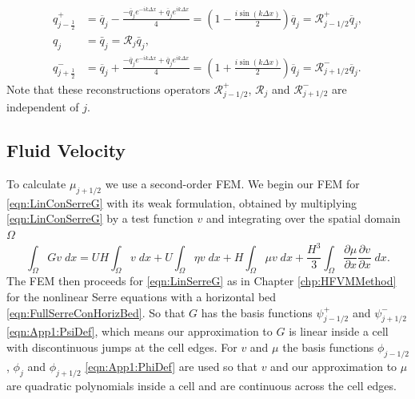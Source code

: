 \begin{subequations}
	\label{eqn:RpmfactorFDVM}
	\begin{align}
	q^+_{j-\frac{1}{2}} &= \overline{q}_j - \frac{- \overline{q}_{j} e^{-ik\Delta x} + \overline{q}_{j} e^{ik\Delta x}}{4} = \left(1  - \frac{i\sin\left(k\Delta x\right)}{2} \right)\overline{q}_{j} = \mathcal{R}^+_{j-1/2}\overline{q}_{j}, \\
	q_j &= \bar{q}_j = \mathcal{R}_{j} \bar{q}_j,\\
	q^-_{j+\frac{1}{2}} &=\overline{q}_j + \frac{- \overline{q}_{j} e^{-ik\Delta x} + \overline{q}_{j} e^{ik\Delta x}}{4} = \left(1  + \frac{i\sin\left(k\Delta x\right)}{2} \right)\overline{q}_{j} =\mathcal{R}^-_{j+1/2} \overline{q}_{j}.
	\end{align}
\end{subequations}  
Note that these reconstructions operators $\mathcal{R}^+_{j-1/2}$, $\mathcal{R}_{j}$ and $\mathcal{R}^-_{j+1/2}$ are independent of $j$. 


\subsection{Fluid Velocity}
To calculate $\mu_{j+1/2}$ we use a second-order FEM. We begin our FEM for \eqref{eqn:LinConSerreG} with its weak formulation, obtained by multiplying \eqref{eqn:LinConSerreG} by a test function $v$ and integrating over the spatial domain $\Omega$
\begin{equation*}
\int_{\Omega}G v \; dx = UH\int_{\Omega} v \; dx + U \int_{\Omega} \eta v \; dx +   H\int_{\Omega} \mu v \; dx  + \frac{H^3}{3} \int_{\Omega} \frac{\partial \mu}{\partial x } \frac{\partial v}{\partial x }\; dx.
\end{equation*}
The FEM then proceeds for \eqref{eqn:LinSerreG} as in Chapter \ref{chp:HFVMMethod} for the nonlinear Serre equations with a horizontal bed \eqref{eqn:FullSerreConHorizBed}. So that $G$ has the basis functions $\psi^+_{j - 1/2}$ and $\psi^-_{j + 1/2}$ \eqref{eqn:App1:PsiDef}, which means our approximation to $G$ is linear inside a cell with discontinuous jumps at the cell edges. For $v$ and $\mu$ the basis functions $\phi_{j-1/2}$, $\phi_{j}$ and $\phi_{j+1/2}$ \eqref{eqn:App1:PhiDef} are used so that $v$ and our approximation to $\mu$ are quadratic polynomials inside a cell and are continuous across the cell edges.

